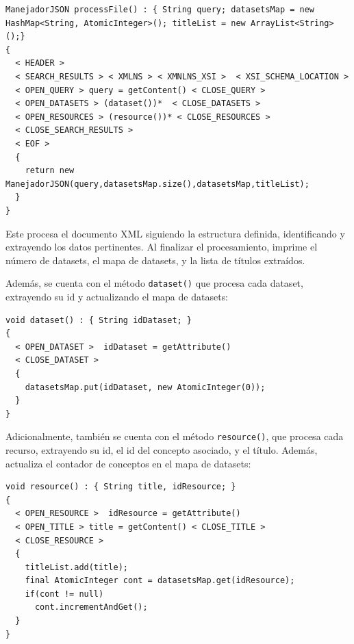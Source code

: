 \lstset{inputencoding=utf8/latin1}
\begin{lstlisting}
ManejadorJSON processFile() : { String query; datasetsMap = new HashMap<String, AtomicInteger>(); titleList = new ArrayList<String>();}
{
  < HEADER > 
  < SEARCH_RESULTS > < XMLNS > < XMNLNS_XSI >  < XSI_SCHEMA_LOCATION > 
  < OPEN_QUERY > query = getContent() < CLOSE_QUERY > 
  < OPEN_DATASETS > (dataset())*  < CLOSE_DATASETS >
  < OPEN_RESOURCES > (resource())* < CLOSE_RESOURCES >
  < CLOSE_SEARCH_RESULTS >
  < EOF >
  {
    return new ManejadorJSON(query,datasetsMap.size(),datasetsMap,titleList);
  }
}

\end{lstlisting}

Este procesa el documento XML siguiendo la estructura definida, identificando y extrayendo los datos pertinentes. Al finalizar el procesamiento, imprime el número de datasets, el mapa de datasets, y la lista de títulos extraídos.

Además, se cuenta con el método \lstinline|dataset()| que procesa cada dataset, extrayendo su id y actualizando el mapa de datasets:


\lstset{inputencoding=utf8/latin1}
\begin{lstlisting}
void dataset() : { String idDataset; } 
{
  < OPEN_DATASET >  idDataset = getAttribute() 
  < CLOSE_DATASET >
  {
    datasetsMap.put(idDataset, new AtomicInteger(0));
  }
}
\end{lstlisting}


Adicionalmente, también se cuenta con el método \lstinline|resource()|, que procesa cada recurso, extrayendo su id, el id del concepto asociado, y el título. Además, actualiza el contador de conceptos en el mapa de datasets:

\lstset{inputencoding=utf8/latin1}
\begin{lstlisting}
void resource() : { String title, idResource; } 
{
  < OPEN_RESOURCE >  idResource = getAttribute() 
  < OPEN_TITLE > title = getContent() < CLOSE_TITLE > 
  < CLOSE_RESOURCE >
  {
    titleList.add(title);
    final AtomicInteger cont = datasetsMap.get(idResource);
    if(cont != null)
      cont.incrementAndGet();
  }
}
\end{lstlisting}

